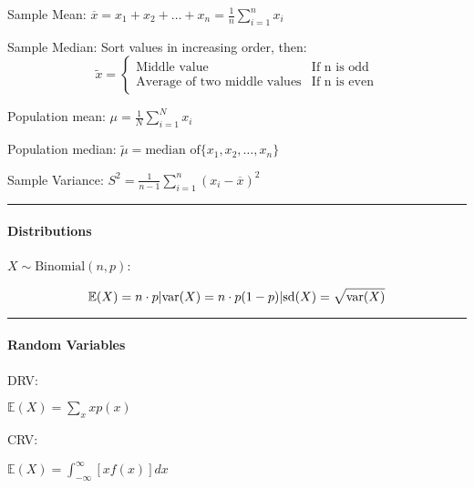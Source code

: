 \documentclass[10pt, letterpaper]{paper}
\newcommand{\horizontal}{\noindent\rule{\hsize}{0.4pt}}
\begin{document}
    \setlength{\belowdisplayskip}{0pt} \setlength{\belowdisplayshortskip}{0pt}
    \setlength{\abovedisplayskip}{0pt} \setlength{\abovedisplayshortskip}{0pt}

    \begin{multicols*}{2}
        Sample Mean: $\overline{x} = x_1 + x_2 + \dots + x_n = \frac{1}{n}\sum\limits_{i=1}^{n}x_i$
        
        Sample Median: Sort values in increasing order, then: 
        $$
            \tilde{x} = 
            \left\{
                \begin{array}{lr}
                    \text{Middle value} & \text{If n is odd} \\
                    \text{Average of two middle values} & \text{If n is even}
                \end{array}
            \right.
        $$

        Population mean: $\mu = \frac{1}{N}\sum\limits_{i=1}^{N}x_i$
        
        Population median: $\tilde{\mu} = \text{median of} \{x_1, x_2, \dots, x_n\}$

        Sample Variance: $S^2 = \frac{1}{n-1}\sum\limits_{i=1}^{n}(x_i-\overline{x})^2$

        \horizontal

        \paragraph*{Distributions}
        
        $X \sim \text{Binomial}(n, p)$:
        
        \begin{equation*}
            \mathbb{E}(X) = n \cdot p \hfill | \hfill \text{var}(X) = n \cdot p(1-p) \hfill | \hfill \text{sd}(X) = \sqrt{\text{var}(X)}    
        \end{equation*}

        \horizontal

        \paragraph*{Random Variables}

        DRV:

        $\mathbb{E}(X) = \sum\limits_{x}xp(x)$
       
        CRV: 
        
        $\mathbb{E}(X) = \int_{-\infty}^{\infty}\left[xf(x)\right]dx$
    \end{multicols*}
\end{document}
